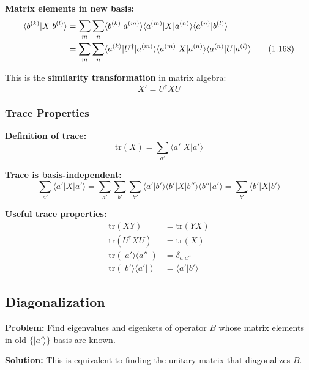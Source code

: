 \documentclass[11pt,a4paper]{article}
\begin{document}
\textbf{Matrix elements in new basis:}
\begin{align}
\langle b^{(k)}|X|b^{(l)}\rangle &= \sum_m\sum_n \langle b^{(k)}|a^{(m)}\rangle\langle a^{(m)}|X|a^{(n)}\rangle\langle a^{(n)}|b^{(l)}\rangle \notag \\
&= \sum_m\sum_n \langle a^{(k)}|U^\dagger|a^{(m)}\rangle\langle a^{(m)}|X|a^{(n)}\rangle\langle a^{(n)}|U|a^{(l)}\rangle
\tag{1.168}
\end{align}

This is the \textbf{similarity transformation} in matrix algebra:
\begin{equation}
\boxed{X' = U^\dagger XU}
\tag{1.169}
\end{equation}

\subsubsection{Trace Properties}

\textbf{Definition of trace:}
\begin{equation}
\text{tr}(X) = \sum_{a'}\langle a'|X|a'\rangle
\tag{1.170}
\end{equation}

\textbf{Trace is basis-independent:}
\begin{equation}
\sum_{a'}\langle a'|X|a'\rangle = \sum_{a'}\sum_{b'}\sum_{b''}\langle a'|b'\rangle\langle b'|X|b''\rangle\langle b''|a'\rangle = \sum_{b'}\langle b'|X|b'\rangle
\tag{1.171}
\end{equation}

\textbf{Useful trace properties:}
\begin{align}
\text{tr}(XY) &= \text{tr}(YX) \tag{1.172a} \\
\text{tr}(U^\dagger XU) &= \text{tr}(X) \tag{1.172b} \\
\text{tr}(|a'\rangle\langle a''|) &= \delta_{a'a''} \tag{1.172c} \\
\text{tr}(|b'\rangle\langle a'|) &= \langle a'|b'\rangle \tag{1.172d}
\end{align}

\subsection{Diagonalization}

\textbf{Problem:} Find eigenvalues and eigenkets of operator $B$ whose matrix elements in old $\{|a'\rangle\}$ basis are known.

\textbf{Solution:} This is equivalent to finding the unitary matrix that diagonalizes $B$.
\end{document}
